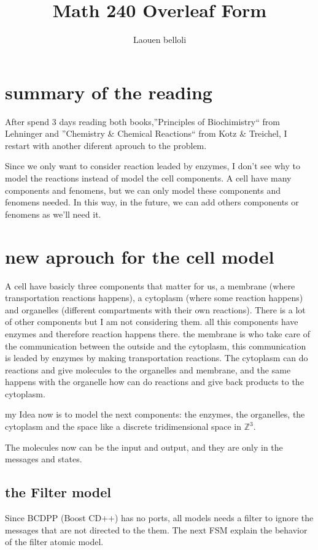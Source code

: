 \documentclass[12pt]{article}
\title{Math 240 Overleaf Form}
\author {Laouen belloli}
\begin{document}
\section*{summary of the reading}
After spend 3 days reading both books,''Principles of Biochimistry`` from Lehninger and ''Chemistry \& Chemical Reactions``  from Kotz \& Treichel, I restart with another diferent aprouch to the problem.

Since we only want to consider reaction leaded by enzymes, I don't see why to model the reactions instead of model the cell components. A cell have many components and fenomens, but we can only model these components and fenomens needed. In this way, in the future, we can add others components or fenomens as we'll need it.


\section*{new aprouch for the cell model}  
A cell have basicly three components that matter for us, a membrane (where transportation reactions happens), a cytoplasm (where some reaction happens) and organelles (different compartments with their own reactions).
There is a lot of other components but I am not considering them.
all this components have enzymes and therefore reaction happens there. the membrane is who take care of the communication between the outside and the cytoplasm, this communication is leaded by enzymes by making transportation reactions. The cytoplasm can do reactions and give molecules to the organelles and membrane, and the same happens with the organelle how can do reactions and give back products to the cytoplasm.

my Idea now is to model the next components: the enzymes, the organelles, the cytoplasm and the space like a discrete tridimensional space in $\mathbb{Z}^3$. 

The molecules now can be the input and output, and they are only in the messages and states.

\newpage
\subsection*{the Filter model}
Since BCDPP (Boost CD++) has no ports, all models needs a filter to ignore the messages that are not directed to the them.
The next FSM explain the behavior of the filter atomic model.
\end{document}

